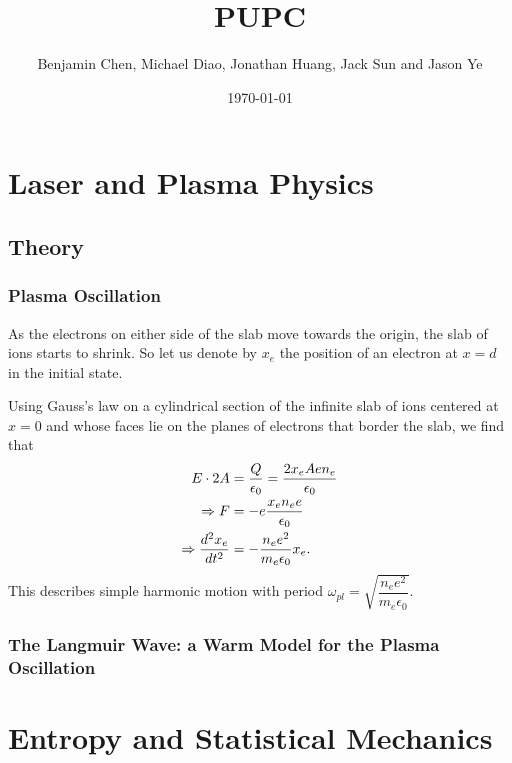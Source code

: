 \documentclass{paper}
\begin{document}

\title{PUPC}
\author{Benjamin Chen, Michael Diao, Jonathan Huang, Jack Sun and Jason Ye}
\date{\today}
\maketitle

\tableofcontents


\chapter{Laser and Plasma Physics}

\section{Theory}
\subsection{Plasma Oscillation}

As the electrons on either side of the slab move towards the origin, the slab of ions starts to shrink. So let us denote by $x_e$ the position of an electron at $x = d$ in the initial state.

Using Gauss's law on a cylindrical section of the infinite slab of ions centered at $x=0$ and whose faces lie on the planes of electrons that border the slab, we find that
\begin{align*}
    E\cdot 2A &= \dfrac{Q}{\epsilon_0} = \dfrac{2x_eAen_e}{\epsilon_0}\\
    \Rightarrow  F &= -e\dfrac{x_en_ee}{\epsilon_0}\\
    \Rightarrow \dfrac{d^2x_e}{dt^2} &= -\dfrac{n_ee^2}{m_e\epsilon_0}x_e\textnormal{.}
\end{align*}
This describes simple harmonic motion with period $\omega_{pl} = \sqrt{\dfrac{n_ee^2}{m_e\epsilon_0}}$.

\subsection{The Langmuir Wave: a Warm Model for the Plasma Oscillation}



\chapter{Entropy and Statistical Mechanics}
\end{document}
